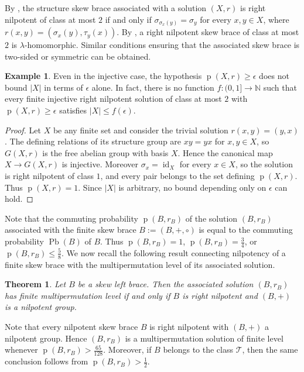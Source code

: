 \documentclass[11pt, oneside]{amsart}
\numberwithin{equation}{section}
\theoremstyle{plain}
\newtheorem{thm}[equation]{Theorem}
\theoremstyle{definition}
\newtheorem{example}[equation]{Example}
\newcommand{\Pb}{\operatorname{Pb} }
\begin{document}
By \cite[Remark~3.20]{JLPTVA26}, the structure skew brace associated with a solution $(X,r)$ is right nilpotent of class at most $2$ if and only if
$\sigma_{\sigma_x(y)}=\sigma_y$ for every $x,y\in X$, where $r(x, y) = (\sigma_x(y), \tau_y(x))$.
By \cite[Corollary~2.10]{JLPTVA26}, a right nilpotent skew brace of class at
most $2$ is $\lambda$-homomorphic. Similar conditions ensuring that the associated skew brace is two-sided or symmetric can be obtained.




\begin{example} %
Even in the injective case, the hypothesis
$\operatorname{p}(X,r)\geqslant\epsilon$ does not bound $|X|$ in terms of
$\epsilon$ alone. In fact, there is no function $f:(0,1]\to\mathbb N$ such
that every finite injective right nilpotent solution of class at most $2$
with $\operatorname{p}(X,r)\geqslant\epsilon$ satisfies $|X|\leqslant f(\epsilon)$.
\end{example}
\begin{proof}
Let $X$ be any finite set and consider the trivial solution
$r(x,y)=(y,x)$. The defining relations of its structure group are
$xy=yx$ for $x,y\in X$, so $G(X,r)$ is the free abelian group with basis
$X$. Hence the canonical map $X\to G(X,r)$ is injective. Moreover
$\sigma_x=\operatorname{id}_X$ for every $x\in X$, so the solution is right
nilpotent of class $1$, and every pair belongs to the set defining
$\operatorname{p}(X,r)$. Thus $\operatorname{p}(X,r)=1$. Since $|X|$ is
arbitrary, no bound depending only on $\epsilon$ can hold.
\end{proof}


Note that the commuting probability $\operatorname{p}(B,r_B)$ of the solution $(B,r_B)$ associated with the finite skew brace $B:=(B,+,\circ)$ is equal to the commuting probability $\Pb(B)$ of $B$. Thus $\operatorname{p}(B,r_B)=1$, $\operatorname{p}(B,r_B)=\frac34$, or $\operatorname{p}(B,r_B)\leqslant\frac58$. We now recall the following result connecting nilpotency of a finite skew brace with the multipermutation level of its associated solution.
\begin{thm} %
    \cite[Theorem~2.20]{CSV19} Let $B$ be a skew left brace. Then the associated solution $(B,r_B)$ has finite multipermutation level if and only if $B$ is right nilpotent and $(B,+)$ is a nilpotent group.
\end{thm}
Note that every nilpotent skew brace $B$ is right nilpotent with $(B,+)$ a nilpotent group. Hence $(B,r_B)$ is a multipermutation solution of finite level whenever $\operatorname{p}(B,r_B)>\frac{65}{128}$. Moreover, if $B$ belongs to the class $\mathcal T$, then the same conclusion follows from $\operatorname{p}(B,r_B)>\frac12$. 
\end{document}
